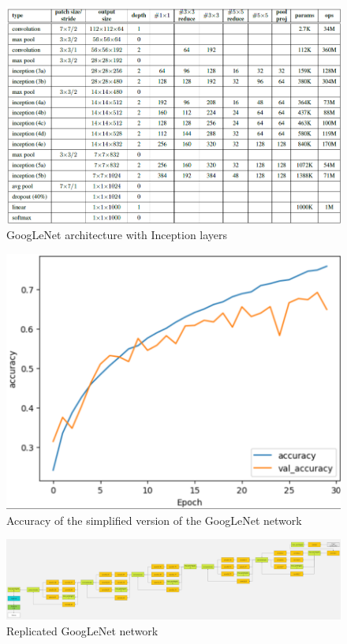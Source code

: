 \documentclass{article}
\begin{document}
\begin{figure}[ht]
    \centering
    \includegraphics[scale=0.7]{project/paper_images/googlenet_arch.png}
    \caption{GoogLeNet architecture with Inception layers}
    \label{fig:googlenet-arch}
\end{figure}

\begin{figure}[ht]
    \centering
    \includegraphics[scale=0.7]{project/paper_images/googlenet_complex_accuracy.png}
    \caption{Accuracy of the simplified version of the GoogLeNet network}
    \label{fig:googlenet-complex-accuracy}
\end{figure}

\begin{figure}[ht]
    \centering
    \includegraphics[width=\textwidth]{project/paper_images/googlenet_complex.png}
    \caption{Replicated GoogLeNet network}
    \label{fig:googlenet-complex}
\end{figure}
\end{document}
